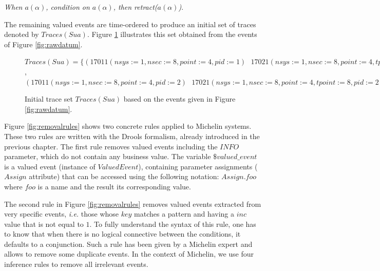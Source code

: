 \textit{When $a(\alpha)$, condition on $a(\alpha)$, then
retract($a(\alpha)$)}.

The remaining valued events are time-ordered to produce an
initial set of traces denoted by $Traces(Sua)$. Figure
\ref{fig:tsua} illustrates this set obtained from the events of
Figure \ref{fig:rawdatum}.

\begin{figure}[ht]
\begin{framed}
    $Traces(Sua) = \{
    (17011(nsys:=1,nsec:=8,point:=4,pid:=1)\text{ }
    17021(nsys:=1,nsec:=8,point:=4,tpoint:=8,pid:=1))$,
    $(17011(nsys:=1,nsec:=8,point:=4,pid:=2)\text{ }
    17021(nsys:=1,nsec:=8,point:=4,tpoint:=8,pid:=2)) \}$
\end{framed}

\caption{Initial trace set $Traces(Sua)$ based on the events
given in Figure \ref{fig:rawdatum}.}
\label{fig:tsua}
\end{figure}

Figure \ref{fig:removalrules} shows two concrete rules applied to
Michelin systems. These two rules are written with the Drools
formalism, already introduced in the previous chapter. The first
rule removes valued events including the $INFO$ parameter,
which do not contain any business value. The variable
$\$valued\_event$ is a valued event (instance of $ValuedEvent$),
containing parameter assignments ($Assign$ attribute) that can be
accessed using the following notation: $Assign.foo$ where $foo$
is a name and the result its corresponding value.

The second rule in Figure \ref{fig:removalrules} removes valued
events extracted from very specific events, \emph{i.e.} those
whose $key$ matches a pattern and having a $inc$ value that is
not equal to $1$.  To fully understand the syntax of this rule,
one has to know that when there is no logical connective between
the conditions, it defaults to a conjunction.  Such a rule has
been given by a Michelin expert and allows to remove some
duplicate events.  In the context of Michelin, we use four
inference rules to remove all irrelevant events.

